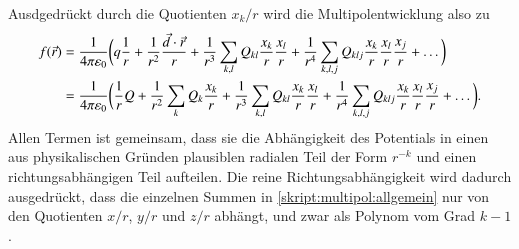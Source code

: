 Ausdgedrückt durch die Quotienten $x_k/r$ wird die Multipolentwicklung
also zu
\begin{align}
f(\vec r)
&=
\frac{1}{4\pi\varepsilon_0}
\biggl(
q
\frac{1}{r}
+
\frac{1}{r^2} \frac{\vec{d}\cdot\vec{r}}{r}
+
\frac{1}{r^3} \sum_{k,l}Q_{kl}\frac{x_k}{r}\frac{x_l}{r}
+
\frac{1}{r^4} \sum_{k,l,j}Q_{klj}\frac{x_k}{r}\frac{x_l}{r}\frac{x_j}{r}
+
\dots
\biggr)
\notag
\\
&=
\frac{1}{4\pi\varepsilon_0}
\biggl(
\frac{1}{r} Q
+
\frac{1}{r^2} \sum_{k}Q_k \frac{x_k}{r}
+
\frac{1}{r^3} \sum_{k,l}Q_{kl}\frac{x_k}{r}\frac{x_l}{r}
+
\frac{1}{r^4} \sum_{k,l,j}Q_{klj}\frac{x_k}{r}\frac{x_l}{r}\frac{x_j}{r}
+
\dots
\biggr).
\label{skript:multipol:allgemein}
\end{align}
Allen Termen ist gemeinsam, dass sie die Abhängigkeit des Potentials in einen
aus physikalischen Gründen plausiblen radialen Teil der Form $r^{-k}$
und einen richtungsabhängigen Teil aufteilen.
Die reine Richtungsabhängigkeit wird dadurch ausgedrückt, dass
die einzelnen Summen in \eqref{skript:multipol:allgemein}
nur von den Quotienten $x/r$, $y/r$ und $z/r$ abhängt, und zwar
als Polynom vom Grad $k-1$.



